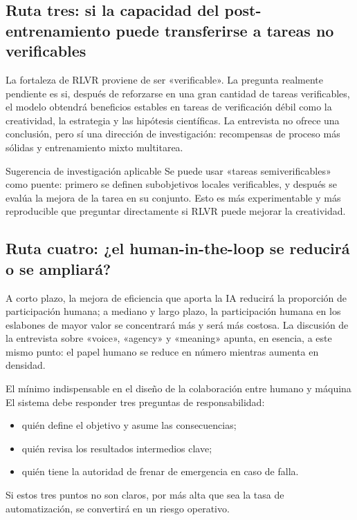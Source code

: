\subsection{Ruta tres: si la capacidad del post-entrenamiento puede transferirse a tareas no verificables}

La fortaleza de RLVR proviene de ser «verificable». La pregunta realmente pendiente es si, después de reforzarse en una gran cantidad de tareas verificables, el modelo obtendrá beneficios estables en tareas de verificación débil como la creatividad, la estrategia y las hipótesis científicas. La entrevista no ofrece una conclusión, pero sí una dirección de investigación: recompensas de proceso más sólidas y entrenamiento mixto multitarea.

\begin{knowledgebox}{Sugerencia de investigación aplicable}
Se puede usar «tareas semiverificables» como puente: primero se definen subobjetivos locales verificables, y después se evalúa la mejora de la tarea en su conjunto. Esto es más experimentable y más reproducible que preguntar directamente si RLVR puede mejorar la creatividad.
\end{knowledgebox}

\subsection{Ruta cuatro: ¿el human-in-the-loop se reducirá o se ampliará?}

A corto plazo, la mejora de eficiencia que aporta la IA reducirá la proporción de participación humana; a mediano y largo plazo, la participación humana en los eslabones de mayor valor se concentrará más y será más costosa. La discusión de la entrevista sobre «voice», «agency» y «meaning» apunta, en esencia, a este mismo punto: el papel humano se reduce en número mientras aumenta en densidad.

\begin{importantbox}{El mínimo indispensable en el diseño de la colaboración entre humano y máquina}
El sistema debe responder tres preguntas de responsabilidad:
\begin{itemize}[leftmargin=1.5em]
    \item quién define el objetivo y asume las consecuencias;
    \item quién revisa los resultados intermedios clave;
    \item quién tiene la autoridad de frenar de emergencia en caso de falla.
\end{itemize}
Si estos tres puntos no son claros, por más alta que sea la tasa de automatización, se convertirá en un riesgo operativo.
\end{importantbox}

